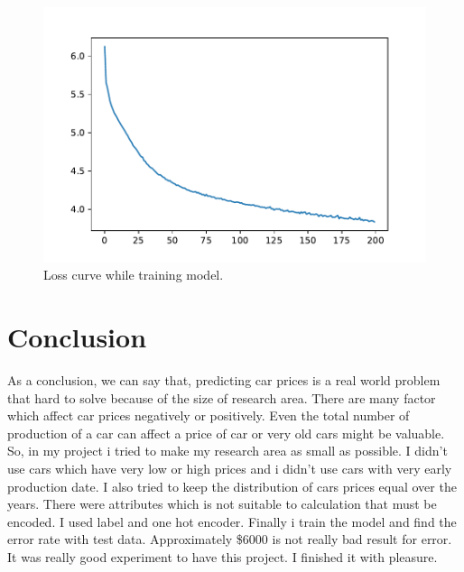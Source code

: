 \documentclass[onecolumn]{article}
\begin{document}
\begin{figure}[H]
\centering
    \includegraphics[width=.7\linewidth]{figures/LOSS_CURVE_.pdf}
\caption{\label{fig:fig16}
Loss curve while training model.}
\end{figure}

\section{Conclusion}
As a conclusion, we can say that, predicting car prices is a real world problem that hard to solve because of the size of research area. There are many factor which affect car prices negatively or positively. Even the total number of production of a car can affect a price of car or very old cars might be valuable. So, in my project i tried to make my research area as small as possible. I didn't use cars which have very low or high prices and i didn't use cars with very early production date. I also tried to keep the distribution of cars prices equal over the years. There were attributes which is not suitable to calculation that must be encoded. I used label and one hot encoder. Finally i train the model and find the error rate with test data. Approximately \$6000 is not really bad result for error.
It was really good experiment to have this project. I finished it with pleasure.

\nocite{*}


\end{document}
